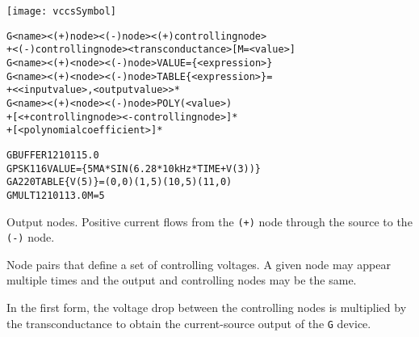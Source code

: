 



\begin{Device}\label{G_DEVICE}

\symbol
{\texttt{[image: vccsSymbol]}}

\device
\begin{alltt}
G<name> <(+) node> <(-) node> <(+) controlling node>
  + <(-) controlling node> <transconductance> [M=<value>]
G<name> <(+) <node> <(-) node> VALUE = \{ <expression> \}
G<name> <(+) <node> <(-) node> TABLE \{ <expression> \} =
+ < <input value>,<output value> >*
G<name> <(+) <node> <(-) node> POLY(<value>)
+ [<+ controlling node> <- controlling node>]*
+ [<polynomial coefficient>]*
\end{alltt}

\examples
\begin{alltt}
GBUFFER 1 2 10 11 5.0
GPSK 11 6 VALUE = \{5MA*SIN(6.28*10kHz*TIME+V(3))\}
GA2 2 0 TABLE \{V(5)\} = (0,0) (1,5) (10,5) (11,0)
GMULT 1 2 10 11 3.0 M=5
\end{alltt}

\parameters

\begin{Parameters}


Output nodes. Positive current flows from the \texttt{(+)} node through
the source to the \texttt{(-)} node.


Node pairs that define a set of controlling voltages. A given node may
appear multiple times and the output and controlling nodes may be the
same.

\end{Parameters}

\comments

In the first form, the voltage drop between the controlling nodes is
multiplied by the transconductance to obtain the current-source
output of the \texttt{G} device. 


\end{Device}
